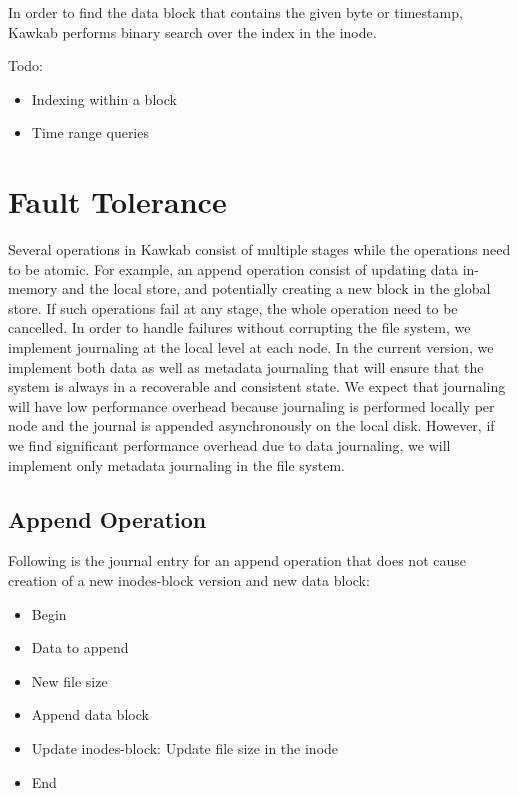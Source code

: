 \documentclass[]{article}
\begin{document}
In order to find the data block that contains the given byte or timestamp, Kawkab
performs binary search over the index in the inode.

Todo:

\begin{itemize}
  \item Indexing within a block
  \item Time range queries
\end{itemize}






\section{Fault Tolerance}

Several operations in Kawkab consist of multiple stages while the operations need 
to be atomic. For example, an append operation consist of updating data in-memory and
the local store, and potentially creating a new block in the global store. If such
operations fail at any stage, the whole operation need to be cancelled. In order
to handle failures without corrupting the file system, we implement journaling
at the local level at each node. In the current version, we implement both
data as well as metadata journaling that will ensure that the system is always
in a recoverable and consistent state. We expect that journaling will have low
performance overhead because journaling is performed locally per node and the
journal is appended asynchronously on the local disk. However, if we find significant
performance overhead due to data journaling, we will implement only metadata journaling
in the file system.

\subsection{Append Operation}

Following is the journal entry for an append operation that does not cause creation
of a new inodes-block version and new data block:

\begin{itemize}

\item Begin
\item Data to append
\item New file size
\item Append data block
\item Update inodes-block: Update file size in the inode
\item End

\end{itemize}
\end{document}
